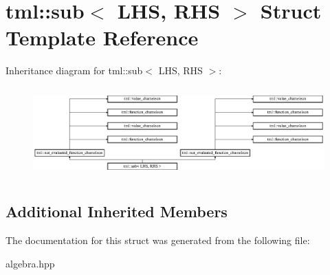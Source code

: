\hypertarget{structtml_1_1sub}{\section{tml\+:\+:sub$<$ L\+H\+S, R\+H\+S $>$ Struct Template Reference}
\label{structtml_1_1sub}
}
Inheritance diagram for tml\+:\+:sub$<$ L\+H\+S, R\+H\+S $>$\+:\begin{figure}[H]
\begin{center}
\leavevmode
\includegraphics[height=3.500000cm]{structtml_1_1sub}
\end{center}
\end{figure}
\subsection*{Additional Inherited Members}


The documentation for this struct was generated from the following file\+:\begin{DoxyCompactItemize}
\item 
algebra.\+hpp\end{DoxyCompactItemize}
